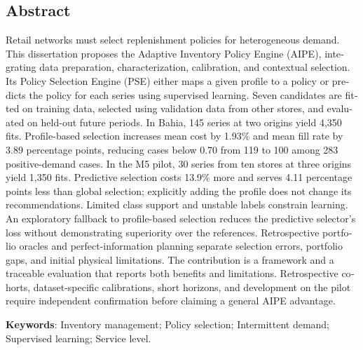 \begin{otherlanguage}{english}
\chapter*{\centering Abstract}
Retail networks must select replenishment policies for heterogeneous demand. This dissertation proposes the Adaptive Inventory Policy Engine (AIPE), integrating data preparation, characterization, calibration, and contextual selection. Its Policy Selection Engine (PSE) either maps a given profile to a policy or predicts the policy for each series using supervised learning. Seven candidates are fitted on training data, selected using validation data from other stores, and evaluated on held-out future periods. In Bahia, 145 series at two origins yield 4,350 fits. Profile-based selection increases mean cost by 1.93\% and mean fill rate by 3.89 percentage points, reducing cases below 0.70 from 119 to 100 among 283 positive-demand cases. In the M5 pilot, 30 series from ten stores at three origins yield 1,350 fits. Predictive selection costs 13.9\% more and serves 4.11 percentage points less than global selection; explicitly adding the profile does not change its recommendations. Limited class support and unstable labels constrain learning. An exploratory fallback to profile-based selection reduces the predictive selector's loss without demonstrating superiority over the references. Retrospective portfolio oracles and perfect-information planning separate selection errors, portfolio gaps, and initial physical limitations. The contribution is a framework and a traceable evaluation that reports both benefits and limitations. Retrospective cohorts, dataset-specific calibrations, short horizons, and development on the pilot require independent confirmation before claiming a general AIPE advantage.

\vspace{2em}
\textbf{Keywords}: Inventory management; Policy selection; Intermittent demand; Supervised learning; Service level.
\end{otherlanguage}
